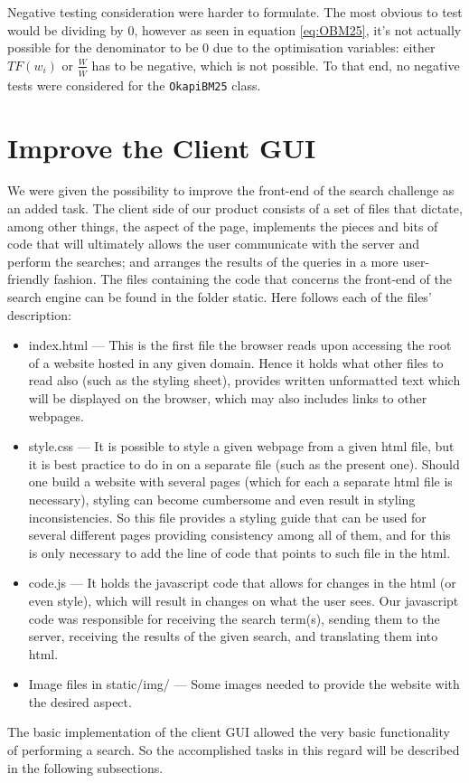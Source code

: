 Negative testing consideration were harder to formulate.
The most obvious to test would be dividing by 0, however as seen in equation \ref{eq:OBM25}, it's not actually possible for the denominator to be 0 due to the optimisation variables: either $TF(w_i)$ or $\frac{W}{\bar{W}}$ has to be negative, which is not possible.
To that end, no negative tests were considered for the {\tt OkapiBM25} class.

\section{Improve the Client GUI} %

We were given the possibility to improve the front-end of the search challenge as an added task. The client side of our product consists of a set of files that dictate, among other things, the aspect of the page, implements the pieces and bits of code that will ultimately allows the user communicate with the server and perform the searches; and arranges the results of the queries in a more user-friendly fashion.\newline
The files containing the code that concerns the front-end of the search engine can be found in the folder static. Here follows each of the files' description:
\begin{itemize}
    \item index.html — This is the first file the browser reads upon accessing the root of a website hosted in any given domain. Hence it holds what other files to read also (such as the styling sheet), provides written unformatted text which will be displayed on the browser, which may also includes links to other webpages.
    \item style.css — It is possible to style a given webpage from a given html file, but it is best practice to do in on a separate file (such as the present one). Should one build a website with several pages (which for each a separate html file is necessary), styling can become cumbersome and even result in styling inconsistencies. So this file provides a styling guide that can be used for several different pages providing consistency among all of them, and for this is only necessary to add the line of code that points to such file in the html.
    \item code.js — It holds the javascript code that allows for changes in the html (or even style), which will result in changes on what the user sees. Our javascript code was responsible for receiving the search term(s), sending them to the server, receiving the results of the given search, and translating them into html.
    \item Image files in static/img/ — Some images needed to provide the website with the desired aspect.
\end{itemize}
The basic implementation of the client GUI allowed the very basic functionality of performing a search. So the accomplished tasks in this regard will be described in the following subsections.

